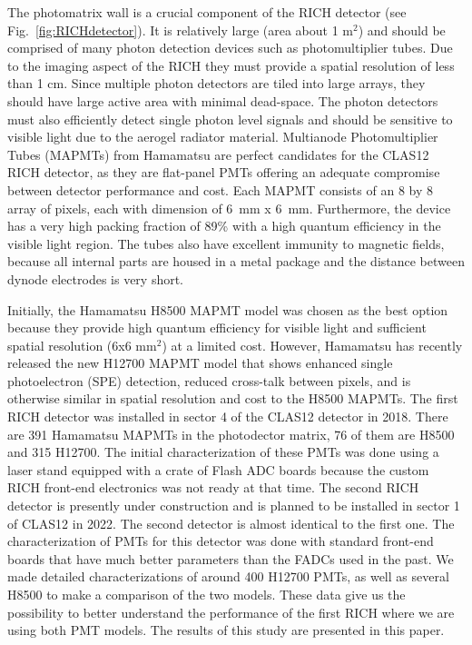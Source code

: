 The photomatrix  wall is a crucial component of the RICH detector (see Fig.~\ref{fig:RICHdetector}). It is relatively large (area about 1 m$^2$) and should be comprised of many photon detection devices such as photomultiplier tubes.
Due to the imaging aspect of the RICH they must provide a spatial resolution of less than 1 cm.
Since multiple photon detectors are tiled into large arrays, they should have large active area with minimal dead-space.
The photon detectors must also efficiently detect single photon level signals and should be sensitive to visible light due to the aerogel radiator material.
Multianode Photomultiplier Tubes (MAPMTs) from Hamamatsu are perfect candidates for the CLAS12 RICH detector, as they are flat-panel PMTs offering an adequate compromise between detector performance and cost.
Each MAPMT consists of an 8 by 8 array of pixels, each with dimension of 6~mm x 6~mm.
Furthermore, the device has a very high packing fraction of 89\% with a high quantum efficiency in the visible light region.
The tubes also have excellent immunity to magnetic fields, because all internal parts are housed in a metal package and the distance between dynode electrodes is very short.


Initially, the Hamamatsu H8500 MAPMT model \cite{H8500} was chosen as the best option because they provide high quantum efficiency for visible light and sufficient spatial resolution (6x6 mm$^2$) at a limited cost.  However, Hamamatsu has recently released the new H12700 MAPMT model  \cite{H12700} that shows enhanced single photoelectron (SPE) detection, reduced cross-talk between pixels, and is otherwise similar in spatial resolution and  cost to the H8500 
MAPMTs. The first RICH detector was installed in sector 4 of the CLAS12 detector in 2018. There are 391 Hamamatsu MAPMTs  in the photodector matrix, 76 of them are H8500 and 315 H12700. 
The initial characterization of these PMTs was done using a laser stand equipped with a crate of Flash ADC  boards \cite{FADC250} because the custom RICH front-end electronics \cite{RICH_FE} was not ready at that time. The second RICH detector is presently under construction and is planned to be installed in sector 1 of CLAS12 in 2022. The second detector is almost identical to the first one. The characterization of PMTs for this detector was done with standard front-end boards that have much better parameters than the FADCs used in the past. We made detailed characterizations of around 400 H12700 PMTs, as well as several H8500  to make a comparison of the two models. These data give us the possibility to better understand the performance of the first RICH where we are using both PMT models. The results of this study are presented in this paper.



